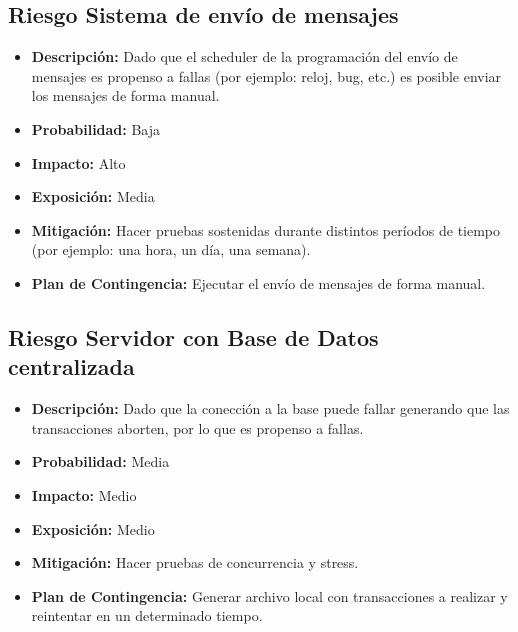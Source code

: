 \documentclass[a4paper, 11pt]{article}
\begin{document}
\subsection{Riesgo Sistema de envío de mensajes}
\begin{itemize}
\item \textbf{Descripci\'on:} Dado que el scheduler de la programaci\'on del env\'io de mensajes es propenso a fallas (por ejemplo: reloj, bug, etc.) es posible enviar los mensajes de forma manual.
\item \textbf{Probabilidad:} Baja
\item \textbf{Impacto:} Alto
\item \textbf{Exposici\'on:} Media
\item \textbf{Mitigaci\'on:} Hacer pruebas sostenidas durante distintos per\'iodos de tiempo (por ejemplo: una hora, un d\'ia, una semana).
\item \textbf{Plan de Contingencia:} Ejecutar el env\'io de mensajes de forma manual.
\end{itemize}

\subsection{Riesgo Servidor con Base de Datos centralizada}
\begin{itemize}

\item \textbf{Descripci\'on:} Dado que la conección a la base puede fallar generando que las transacciones aborten, por lo que es propenso a fallas.
\item \textbf{Probabilidad:} Media
\item \textbf{Impacto:} Medio
\item \textbf{Exposici\'on:} Medio
\item \textbf{Mitigaci\'on:} Hacer pruebas de concurrencia y stress.
\item \textbf{Plan de Contingencia:} Generar archivo local con transacciones a realizar y reintentar en un determinado tiempo.
\end{itemize}

\end{document}
